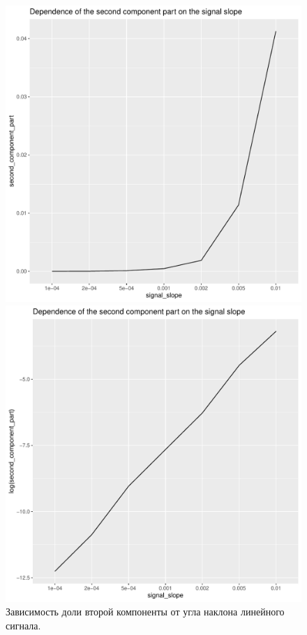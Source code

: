 \documentclass[specialist, substylefile = spbureport.rtx,
    subf,href,colorlinks=true, 12pt]{disser}
\begin{document}
        
        \begin{figure}[h]
            \centering
            \begin{minipage}{.45\textwidth}
                \centering
                \includegraphics[width=\textwidth]{experiment_3_secondpart1.pdf}
                \caption{Зависимость доли второй компоненты от угла наклона линейного сигнала.}
                \label{fig:exp3_secondpart1}
            \end{minipage}\hfill
            \begin{minipage}{.45\textwidth}
                \centering
            \includegraphics[width=\textwidth]{experiment_3_secondpart2.pdf}

\end{minipage}
\end{figure}
\end{document}
